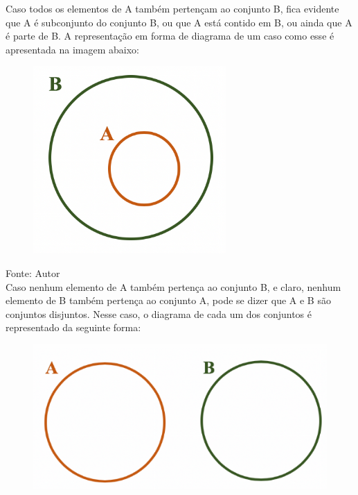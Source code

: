\begin{multicols*}{2}
	Caso todos os elementos de A também pertençam ao conjunto B, fica evidente que A é subconjunto do conjunto B, ou que A está contido em B, ou ainda que A é parte de B. A representação em forma de diagrama de um caso como esse é apresentada na imagem abaixo:

	\begin{figure}[H]
		\centering
		\includegraphics[width=\columnwidth]{assets/Conjunto Contido.png}
	\end{figure}

	Fonte: Autor\\

	Caso nenhum elemento de A também pertença ao conjunto B, e claro, nenhum elemento de B também pertença ao conjunto A, pode se dizer que A e B são conjuntos disjuntos. Nesse caso, o diagrama de cada um dos conjuntos é representado da seguinte forma:\\

	\begin{figure}[H]
		\centering
		\includegraphics[width=\columnwidth]{assets/Conjunto Disjunto.png}
	\end{figure}


\end{multicols*}

